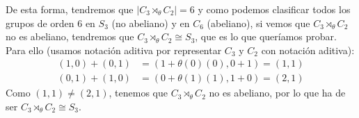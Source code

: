 \begin{ejemplo}
\begin{itemize}
            De esta forma, tendremos que $|C_3\rtimes_\theta C_2| = 6$ y como podemos clasificar todos los grupos de orden 6 en $S_3$ (no abeliano) y en $C_6$ (abeliano), si vemos que $C_3\rtimes_\theta C_2$ no es abeliano, tendremos que $C_3\rtimes_\theta C_2 \cong S_3$, que es lo que queríamos probar. Para ello (usamos notación aditiva por representar $C_3$ y $C_2$ con notación aditiva):
            \begin{align*}
                (1, 0) + (0, 1) &= (1 + \theta(0)(0), 0+1) = (1, 1) \\
                (0, 1) + (1, 0) &= (0 + \theta(1)(1), 1+0) = (2, 1)
            \end{align*}
            Como $(1,1) \neq (2,1)$, tenemos que $C_3\rtimes_\theta C_2$ no es abeliano, por lo que ha de ser $C_3\rtimes_\theta C_2 \cong S_3$.





\end{itemize}
\end{ejemplo}

